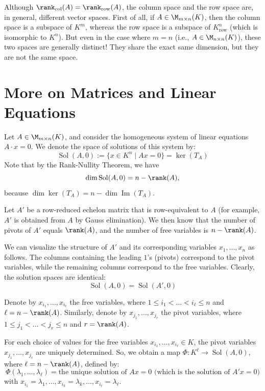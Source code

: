 \begin{importantremark}
Although $\rank_{\text{col}}(A) = \rank_{\text{row}}(A)$, the column space and the row space are, in general, different vector spaces. First of all, if $A \in \M_{m \times n}(K)$, then the column space is a subspace of $K^m$, whereas the row space is a subspace of $K_{\text{row}}^n$ (which is isomorphic to $K^n$). But even in the case where $m = n$ (i.e., $A \in \M_{n \times n}(K)$), these two spaces are generally distinct! They share the exact same dimension, but they are not the same space.
\end{importantremark}

\section{More on Matrices and Linear Equations}

Let $A \in \M_{m \times n}(K)$, and consider the homogeneous system of linear equations $A \cdot x = 0$. We denote the space of solutions of this system by:
\begin{equation*}
    \operatorname{Sol}(A, 0) := \{x \in K^n \mid A x = 0\} = \ker(T_A)
\end{equation*}
Note that by the Rank-Nullity Theorem, we have 
\[\dim \operatorname{Sol}(A, 0) = n - \rank(A),\] 
because $\dim \ker(T_A) = n - \dim \operatorname{Im}(T_A)$.

Let $A'$ be a row-reduced echelon matrix that is row-equivalent to $A$ (for example, $A'$ is obtained from $A$ by Gauss elimination). We then know that the number of pivots of $A'$ equals $\rank(A)$, and the number of free variables is $n - \rank(A)$.

We can visualize the structure of $A'$ and its corresponding variables $x_1, \dots, x_n$ as follows. The columns containing the leading $1$'s (pivots) correspond to the pivot variables, while the remaining columns correspond to the free variables. Clearly, the solution spaces are identical:
\begin{equation*}
    \operatorname{Sol}(A, 0) = \operatorname{Sol}(A', 0)
\end{equation*}

Denote by $x_{i_1}, \dots, x_{i_\ell}$ the free variables, where $1 \le i_1 < \dots < i_\ell \le n$ and $\ell = n - \rank(A)$. Similarly, denote by $x_{j_1}, \dots, x_{j_r}$ the pivot variables, where $1 \le j_1 < \dots < j_r \le n$ and $r = \rank(A)$.

For each choice of values for the free variables $x_{i_1}, \dots, x_{i_\ell} \in K$, the pivot variables $x_{j_1}, \dots, x_{j_r}$ are uniquely determined. So, we obtain a map $\Phi: K^\ell \to \operatorname{Sol}(A, 0)$, where $\ell = n - \rank(A)$, defined by:
\begin{equation*}
    \Phi(\lambda_1, \dots, \lambda_\ell) = \text{the unique solution of } Ax = 0 \text{ (which is the solution of } A'x = 0 \text{)}
\end{equation*}
with $x_{i_1} = \lambda_1, \dots, x_{i_k} = \lambda_k, \dots, x_{i_\ell} = \lambda_\ell$.

